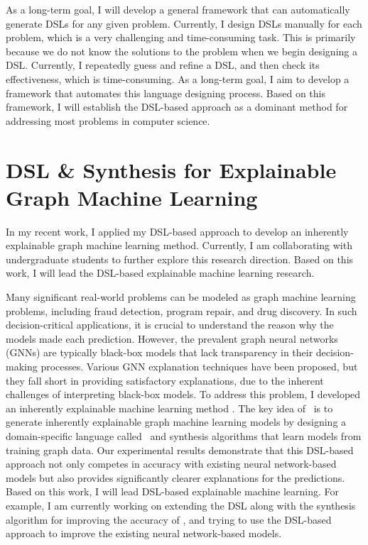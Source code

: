 \documentclass[11pt]{article}
\newcommand{\myparagraph}[1]{\medskip\noindent{\it \textbf{#1.}}}
\begin{document}
As a long-term goal, I will develop a general framework that can automatically generate DSLs for any given problem. 
%
Currently, I design DSLs manually for each problem, which is a very challenging and time-consuming task. 
%
This is primarily because we do not know the solutions to the problem when we begin designing a DSL.
%
Currently, I repeatedly guess and refine a DSL, and then check its effectiveness, which is time-consuming.
%
As a long-term goal, I aim to develop a framework that automates this language designing process.
%
Based on this framework, I will establish the DSL-based approach as a dominant method for addressing most problems in computer science.



\section{DSL \& Synthesis for Explainable Graph Machine Learning}
%
In my recent work, I applied my DSL-based approach to develop an inherently explainable graph machine learning method.
%
Currently, I am collaborating with undergraduate students to further explore this research direction.
%
Based on this work, I will lead the DSL-based explainable machine learning research.


\myparagraph{PL4XGL~\cite{Jeon2024}}
Many significant real-world problems can be modeled as graph machine learning problems, including fraud detection, program repair, and drug discovery.
%
In such decision-critical applications, it is crucial to understand the reason why the models made each prediction.
%
However, the prevalent graph neural networks (GNNs) are typically black-box models that lack transparency in their decision-making processes.
%
Various GNN explanation techniques have been proposed, but they fall short in providing satisfactory explanations, due to the inherent challenges of interpreting black-box models. 
%
To address this problem, I developed an inherently explainable machine learning method {\PLXGL}.
%
The key idea of \PLXGL~is to generate inherently explainable graph machine learning models by designing a domain-specific language called \GDL~and synthesis algorithms that learn models from training graph data.
%
Our experimental results demonstrate that this DSL-based approach not only competes in accuracy with existing neural network-based models but also provides significantly clearer explanations for the predictions.
%
Based on this work, I will lead DSL-based explainable machine learning.
%
For example, I am currently working on extending the DSL along with the synthesis algorithm for improving the accuracy of {\PLXGL}, and trying to use the DSL-based approach to improve the existing neural network-based models.
\end{document}
